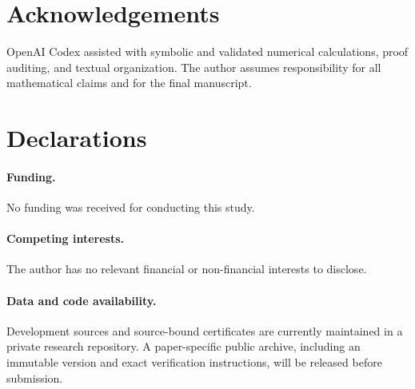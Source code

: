 \documentclass[11pt]{article}
\begin{document}
\section*{Acknowledgements}
OpenAI Codex assisted with symbolic and validated numerical calculations,
proof auditing, and textual organization.  The author assumes responsibility
for all mathematical claims and for the final manuscript.

\section*{Declarations}
\paragraph{Funding.} No funding was received for conducting this study.
\paragraph{Competing interests.} The author has no relevant financial or
non-financial interests to disclose.
\paragraph{Data and code availability.} Development sources and source-bound
certificates are currently maintained in a private research repository.  A
paper-specific public archive, including an immutable version and exact
verification instructions, will be released before submission.

\begingroup
\small


\endgroup
\end{document}
